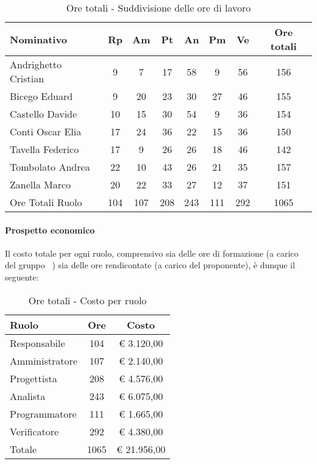 \documentclass[../PianoProgetto.tex]{subfiles}
\begin{document}
					\begin{table}[h]
		\centering
	
		\begin{tabular}{l * {7}{c}}
			\toprule
			Nominativo & Rp & Am & Pt & An & Pm & Ve & Ore totali \\
			\midrule
			Andrighetto Cristian & 9 & 7 & 17 & 58 & 9 & 56 &	156 \\
			\midrule
			Bicego Eduard & 9 & 20 & 23 & 30 & 27 & 46 & 155 \\
			\midrule
			Castello Davide & 10 & 15 & 30 & 54 & 9 & 36 & 154 \\
			\midrule
			Conti Oscar Elia & 17 & 24 & 36 & 22 & 15 & 36 & 150 \\
			\midrule
			Tavella Federico &	17 & 9 & 26 & 26 & 18 & 46 & 142 \\
			\midrule
			Tombolato Andrea & 22 & 10 & 43 & 26 & 21 & 35 & 157 \\
			\midrule
			Zanella Marco & 20 & 22 & 33 & 27 & 12 & 37 & 151 \\
			\midrule			
			Ore Totali Ruolo & 104 & 107 & 208 & 243 & 111 & 292 & 1065 \\
			\bottomrule
			
		\end{tabular}
		
		\caption{Ore totali - Suddivisione delle ore di lavoro}
		\label{tab:totale_ore}
		
	\end{table}
	
	
	\paragraph{Prospetto economico}
					Il costo totale per ogni ruolo, comprensivo sia delle ore di formazione (a carico del gruppo \leaf\ ) sia delle ore rendicontate (a carico del proponente), è dunque il seguente:
					\begin{table}[h]
		\centering
	
		\begin{tabular}{l * {2}{c}}
			\toprule
			Ruolo & Ore & Costo \\
			\midrule
			Responsabile &	104 & \euro{} 3.120,00 \\
			\midrule
			Amministratore & 107 & \euro{} 2.140,00 \\
			\midrule
			Progettista & 208 & \euro{} 4.576,00 \\
			\midrule
			Analista & 243 & \euro{} 6.075,00 \\
			\midrule
			Programmatore & 111 & \euro{} 1.665,00 \\
			\midrule
			Verificatore & 292 & \euro{} 4.380,00 \\
			\midrule		
			Totale & 1065 & \euro{} 21.956,00 \\
			\bottomrule
			
		\end{tabular}
		
		\caption{Ore totali - Costo per ruolo}
		\label{tab:totale_costo}
		
	\end{table}
	
\end{document}
